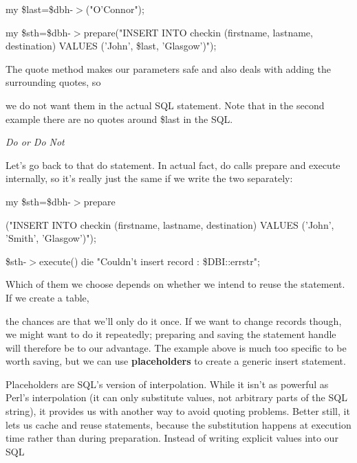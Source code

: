 \documentclass[a4paper,11pt]{book}
\begin{document}
\noindent 

\noindent my \$last=\$dbh-$>$("O'Connor");

\noindent my \$sth=\$dbh-$>$prepare("INSERT INTO checkin (firstname, lastname, destination) VALUES ('John', \$last, 'Glasgow')");

\noindent 

\noindent The quote method makes our parameters safe and also deals with adding the surrounding quotes, so

\noindent we do not want them in the actual SQL statement. Note that in the second example there are no quotes around \$last in the SQL.

\noindent 

\noindent \textit{Do or Do Not}

\noindent Let's go back to that do statement. In actual fact, do calls prepare and execute internally, so it's really just the same if we write the two separately:

\noindent 

\noindent my \$sth=\$dbh-$>$prepare

\noindent ("INSERT INTO checkin (firstname, lastname, destination) VALUES ('John', 'Smith',  'Glasgow')");

\noindent 

\noindent \$sth-$>$execute() \textbar \textbar  die "Couldn't insert record : \$DBI::errstr";

\noindent 

\noindent 

\noindent Which of them we choose depends on whether we intend to reuse the statement. If we create a table,

\noindent the chances are that we'll only do it once. If we want to change records though, we might want to do it repeatedly; preparing and saving the statement handle will therefore be to our advantage. The example above is much too specific to be worth saving, but we can use \textbf{placeholders }to create a generic insert statement.

\noindent 

\noindent Placeholders are SQL's version of interpolation. While it isn't as powerful as Perl's interpolation (it can only substitute values, not arbitrary parts of the SQL string), it provides us with another way to avoid quoting problems. Better still, it lets us cache and reuse statements, because the substitution happens at execution time rather than during preparation. Instead of writing explicit values into our SQL
\end{document}
